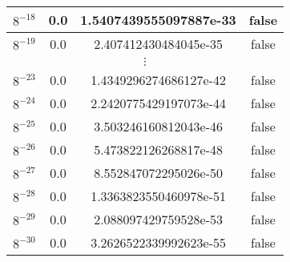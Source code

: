 \documentclass[]{article}
\begin{document}
\begin{table}[!h]
\begin{tabular}{|c|c|c|c|}
			$8^{-18}$ & 0.0 & 1.5407439555097887e-33 & false \\ \hline
			$8^{-19}$ & 0.0 & 2.407412430484045e-35 & false \\ \hline
			\multicolumn{4}{c}{$\vdots$} \\ \hline
			$8^{-23}$ & 0.0 & 1.4349296274686127e-42 & false \\ \hline
			$8^{-24}$ & 0.0 & 2.2420775429197073e-44 & false \\ \hline
			$8^{-25}$ & 0.0 & 3.503246160812043e-46 & false \\ \hline
			$8^{-26}$ & 0.0 & 5.473822126268817e-48 & false \\ \hline
			$8^{-27}$ & 0.0 & 8.552847072295026e-50 & false \\ \hline
			$8^{-28}$ & 0.0 & 1.3363823550460978e-51 & false \\ \hline
			$8^{-29}$ & 0.0 & 2.088097429759528e-53 & false \\ \hline
			$8^{-30}$ & 0.0 & 3.2626522339992623e-55 & false \\ \hline
		\end{tabular}
	\end{table}
\end{document}
